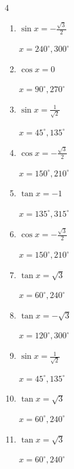 \begin{multicols}{4}
\begin{enumerate}
        $\displaystyle x = 135^{\circ} , 315^{\circ}$

  \item $\displaystyle \sin{x}  = -\frac{\sqrt{3}}{2}$

        $\displaystyle x = 240^{\circ} , 300^{\circ}$

  \item $\displaystyle \cos{x}  = 0$

        $\displaystyle x = 90^{\circ} , 270^{\circ}$

  \item $\displaystyle \sin{x}  = \frac{1}{\sqrt{2}}$

        $\displaystyle x = 45^{\circ} , 135^{\circ}$

  \item $\displaystyle \cos{x}  = -\frac{\sqrt{3}}{2}$

        $\displaystyle x = 150^{\circ} , 210^{\circ}$

  \item $\displaystyle \tan{x}  = -1$

        $\displaystyle x = 135^{\circ} , 315^{\circ}$

  \item $\displaystyle \cos{x}  = -\frac{\sqrt{3}}{2}$

        $\displaystyle x = 150^{\circ} , 210^{\circ}$

\columnbreak %

  \item $\displaystyle \tan{x}  = \sqrt{3}$

        $\displaystyle x = 60^{\circ} , 240^{\circ}$

  \item $\displaystyle \tan{x}  = -\sqrt{3}$

        $\displaystyle x = 120^{\circ} , 300^{\circ}$

  \item $\displaystyle \sin{x}  = \frac{1}{\sqrt{2}}$

        $\displaystyle x = 45^{\circ} , 135^{\circ}$

  \item $\displaystyle \tan{x}  = \sqrt{3}$

        $\displaystyle x = 60^{\circ} , 240^{\circ}$

  \item $\displaystyle \tan{x}  = \sqrt{3}$

        $\displaystyle x = 60^{\circ} , 240^{\circ}$


\end{enumerate}
\end{multicols}
